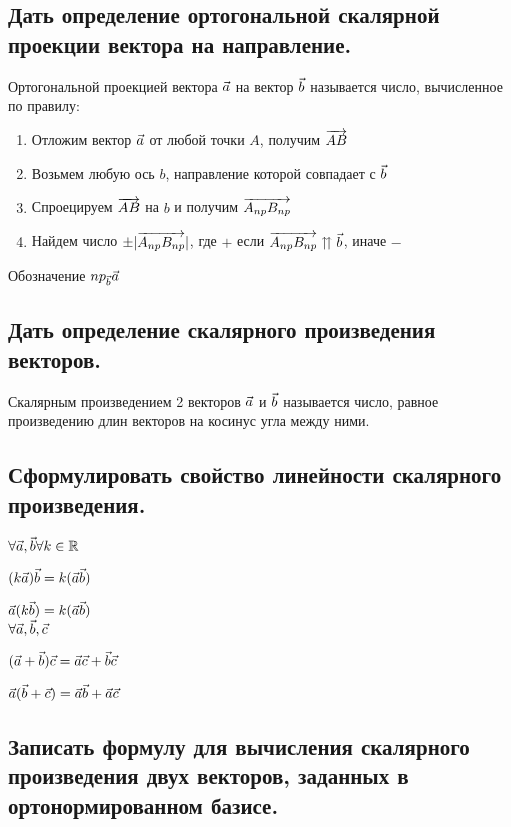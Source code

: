 \subsection{Дать определение ортогональной скалярной проекции вектора на направление.}

Ортогональной проекцией вектора $\vec{a}$ на вектор $\vec{b}$ называется число, вычисленное по правилу:
\begin{enumerate}
    \item Отложим вектор $\vec{a}$ от любой точки $A$, получим $\overrightarrow{AB}$
    \item Возьмем любую ось $b$, направление которой совпадает с $\vec{b}$
    \item Спроецируем $\overrightarrow{AB}$ на $b$ и получим  $\overrightarrow{A_{np}B_{np}}$
    \item Найдем число $\pm |\overrightarrow{A_{np}B_{np}}|$, где $+$ если $\overrightarrow{A_{np}B_{np}} \upuparrows \vec{b}$, иначе $-$
\end{enumerate}
Обозначение $np_{\vec{b}} \vec{a}$

\subsection{Дать определение скалярного произведения векторов.}

Скалярным произведением 2 векторов $\vec{a}$ и $\vec{b}$ называется число, равное произведению длин
векторов на косинус угла между ними.

\subsection{Сформулировать свойство линейности скалярного произведения.}

\begin{center}
$\forall \vec{a}, \vec{b} \forall k \in \mathbb{R}$

$(k\vec{a})\vec{b} = k(\vec{a}\vec{b})$

$\vec{a}(k\vec{b}) = k(\vec{a}\vec{b})$\\

$\forall \vec{a}, \vec{b}, \vec{c}$

$(\vec{a} + \vec{b})\vec{c} = \vec{a}\vec{c} + \vec{b}\vec{c}$

$\vec{a}(\vec{b} + \vec{c}) = \vec{a}\vec{b} + \vec{a}\vec{c}$
\end{center}

\subsection{Записать формулу для вычисления скалярного произведения двух векторов, заданных в ортонормированном базисе.}

